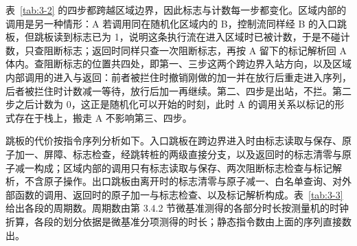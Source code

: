 表~\ref{tab:3-2} 的四步都跨越区域边界，因此标志与计数每一步都变化。区域内部的调用是另一种情形：A 若调用同在随机化区域内的 B，控制流同样经 B 的入口跳板，但跳板读到标志已为 1，说明这条执行流在进入区域时已被计数，于是不碰计数，只查阻断标志；返回时同样只查一次阻断标志，再按 A 留下的标记解析回 A 体内。查阻断标志的位置共四处，即第一、三步这两个跨边界入站方向，以及区域内部调用的进入与返回：前者被拦住时撤销刚做的加一并在放行后重走进入序列，后者被拦住时计数减一等待，放行后加一再继续。第二、四步是出站，不拦。第二步之后计数为 0，这正是随机化可以开始的时刻，此时 A 的调用关系以标记的形式存在于栈上，搬走 A 不影响第三、四步。

跳板的代价按指令序列分析如下。入口跳板在跨边界进入时由标志读取与保存、原子加一、屏障、标志检查，经跳转桩的两级直接分支，以及返回时的标志清零与原子减一构成；区域内部的调用只有标志读取与保存、两次阻断标志检查与标记解析，不含原子操作。出口跳板由离开时的标志清零与原子减一、白名单查询、对外部函数的调用、返回时的原子加一与标志检查、以及标记解析构成。表~\ref{tab:3-3} 给出各段的周期数。周期数由第 3.4.2 节微基准测得的各部分时长按测量机的时钟折算，各段的划分依据是微基准分项测得的时长；静态指令数由上面的序列直接数出。

